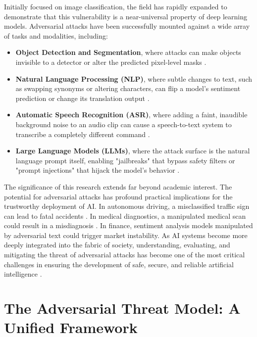 \documentclass[../main.tex]{subfiles}
\begin{document}
Initially focused on image classification, the field has rapidly expanded to demonstrate that this vulnerability is a near-universal property of deep learning models. Adversarial attacks have been successfully mounted against a wide array of tasks and modalities, including:
\begin{itemize}
    \item \textbf{Object Detection and Segmentation}, where attacks can make objects invisible to a detector or alter the predicted pixel-level masks \cite{xie2017DAG, lu2017fooldetectors}.
    \item \textbf{Natural Language Processing (NLP)}, where subtle changes to text, such as swapping synonyms or altering characters, can flip a model's sentiment prediction or change its translation output \cite{jin2019textfooler, li2018textbugger}.
    \item \textbf{Automatic Speech Recognition (ASR)}, where adding a faint, inaudible background noise to an audio clip can cause a speech-to-text system to transcribe a completely different command \cite{qin2019imperceptible, zelasko2021adversarial}.
    \item \textbf{Large Language Models (LLMs)}, where the attack surface is the natural language prompt itself, enabling "jailbreaks" that bypass safety filters or "prompt injections" that hijack the model's behavior \cite{perez2022ignorepreviouspromptattack, zou2023universaltransferableadversarialattacks}.
\end{itemize}

The significance of this research extends far beyond academic interest. The potential for adversarial attacks has profound practical implications for the trustworthy deployment of AI. In autonomous driving, a misclassified traffic sign can lead to fatal accidents \cite{3d_physical_attacks}. In medical diagnostics, a manipulated medical scan could result in a misdiagnosis \cite{kurakin2017adversarialmachinelearningscale}. In finance, sentiment analysis models manipulated by adversarial text could trigger market instability. As AI systems become more deeply integrated into the fabric of society, understanding, evaluating, and mitigating the threat of adversarial attacks has become one of the most critical challenges in ensuring the development of safe, secure, and reliable artificial intelligence \cite{yuan2018adversarialexamplesattacksdefenses, akhtar2018threatadversarialattacksdeep}.

\section{The Adversarial Threat Model: A Unified Framework}
\label{sec:threat_model}
\end{document}
